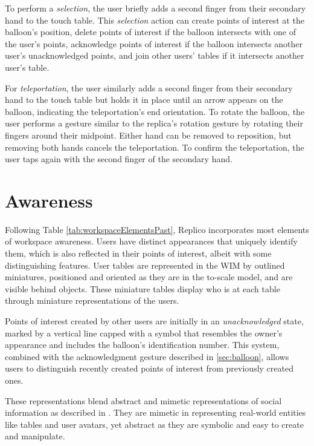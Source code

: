         To perform a \textit{selection}, the user briefly adds a second finger from their secondary hand to the touch table. This \textit{selection} action can create points of interest at the balloon's position, delete points of interest if the balloon intersects with one of the user's points, acknowledge points of interest if the balloon intersects another user's unacknowledged points, and join other users' tables if it intersects another user's table.
    
        For \textit{teleportation}, the user similarly adds a second finger from their secondary hand to the touch table but holds it in place until an arrow appears on the balloon, indicating the teleportation's end orientation. To rotate the balloon, the user performs a gesture similar to the replica's rotation gesture by rotating their fingers around their midpoint. Either hand can be removed to reposition, but removing both hands cancels the teleportation. To confirm the teleportation, the user taps again with the second finger of the secondary hand.


\section{Awareness} \label{sec:awareness}

    Following Table \ref{tab:workspaceElementsPast}, Replico incorporates most elements of workspace awareness. Users have distinct appearances that uniquely identify them, which is also reflected in their points of interest, albeit with some distinguishing features. User tables are represented in the WIM by outlined miniatures, positioned and oriented as they are in the to-scale model, and are visible behind objects. These miniature tables display who is at each table through miniature representations of the users.
    
    Points of interest created by other users are initially in an \textit{unacknowledged} state, marked by a vertical line capped with a symbol that resembles the owner's appearance and includes the balloon's identification number. This system, combined with the acknowledgment gesture described in \ref{sec:balloon}, allows users to distinguish recently created points of interest from previously created ones.
    
    These representations blend abstract and mimetic representations of social information as described in \cite{ericksonSocialTranslucenceApproach2000}. They are mimetic in representing real-world entities like tables and user avatars, yet abstract as they are symbolic and easy to create and manipulate.
    
